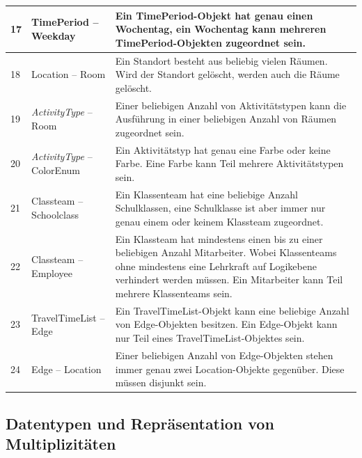 \documentclass[fontsize=12pt,paper=a4,twoside]{scrartcl}
\begin{document}
\begin{tabularx}{\textwidth}{|p{0.6cm}|p{5cm}|X|}
\hline
17 	& TimePeriod -- Weekday & Ein TimePeriod-Objekt hat genau einen Wochentag, ein Wochentag kann 
	mehreren TimePeriod-Objekten zugeordnet sein.\\\hline 
18	& Location -- Room						& Ein Standort besteht aus beliebig vielen Räumen. 
	Wird der Standort gelöscht, werden auch die Räume gelöscht.\\\hline
19	& \textit{ActivityType} -- Room					& Einer beliebigen Anzahl von Aktivitätstypen
	kann die Ausführung in einer beliebigen Anzahl von Räumen zugeordnet sein. \\\hline
20	& \textit{ActivityType} -- ColorEnum 		& Ein Aktivitätstyp hat genau eine Farbe oder keine 
	Farbe. Eine Farbe kann Teil mehrere Aktivitätstypen sein.\\\hline
21	& Classteam -- Schoolclass 					& Ein Klassenteam hat eine beliebige Anzahl 
	Schulklassen, eine Schulklasse ist aber immer nur genau einem oder keinem Klassteam zugeordnet.\\\hline
22	& Classteam -- Employee 					& Ein Klassteam hat mindestens einen bis zu 
	einer beliebigen Anzahl Mitarbeiter. Wobei Klassenteams ohne mindestens eine Lehrkraft auf Logikebene verhindert werden müssen. Ein Mitarbeiter kann Teil mehrere Klassenteams sein. \\\hline
23	& TravelTimeList -- Edge 					& Ein TravelTimeList-Objekt kann eine beliebige
	Anzahl von Edge-Objekten besitzen. Ein Edge-Objekt kann nur Teil eines TravelTimeList-Objektes sein. \\\hline
24	& Edge -- Location							& Einer beliebigen Anzahl von Edge-Objekten stehen 
	immer genau zwei Location-Objekte gegenüber. Diese müssen disjunkt sein. \\\hline 
\end{tabularx}
\subsection{Datentypen und Repräsentation von Multiplizitäten}
\end{document}
